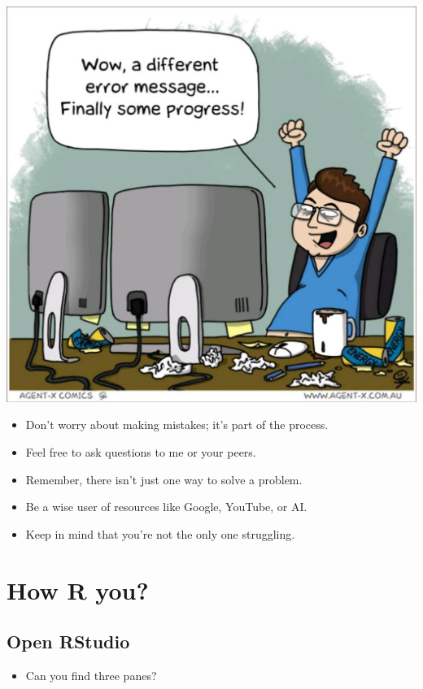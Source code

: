 \documentclass[
]{book}
\providecommand{\tightlist}{%
  \setlength{\itemsep}{0pt}\setlength{\parskip}{0pt}}
\begin{document}
\includegraphics{./img/programming_meme.jpg}

\begin{itemize}
\item
  Don't worry about making mistakes; it's part of the process.
\item
  Feel free to ask questions to me or your peers.
\item
  Remember, there isn't just one way to solve a problem.
\item
  Be a wise user of resources like Google, YouTube, or AI.
\item
  Keep in mind that you're not the only one struggling.
\end{itemize}

\section{How R you?}\label{how-r-you}

\subsection{Open RStudio}\label{open-rstudio}

\begin{itemize}
\tightlist
\item
  Can you find three panes?
\end{itemize}
\end{document}
